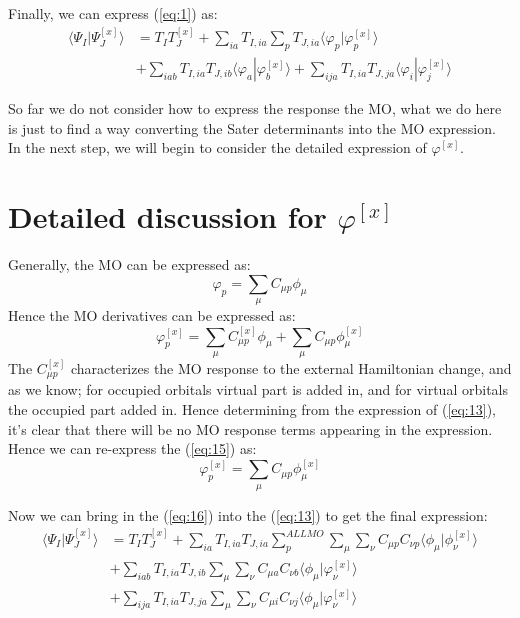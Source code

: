 \documentclass[a4paper,12pt]{article}
\theoremstyle{definition}\newtheorem{law}{Law}
\theoremstyle{plain}\newtheorem{theorem}{Theorem}
\theoremstyle{remark}\newtheorem{remark}{Remark}
\theoremstyle{axiom}\newtheorem{axiom}{Axiom}
\begin{document}
Finally, we can express (\ref{eq:1}) as:
\begin{equation}
 \label{eq:13}
\begin{split}
 \langle\Psi_{I}|\Psi_{J}^{[x]}\rangle &= T_{I}T_{J}^{[x]} +
\sum_{ia}T_{I,ia}\sum_{p}T_{J,ia}\langle\varphi_{p}|\varphi^{[x]}_{p}\rangle
\nonumber \\
&+\sum_{iab}T_{I,ia}T_{J,ib}\langle\varphi_{a}|\varphi_{b}^{[x]}\rangle
+\sum_{ija}T_{I,ia}T_{J,ja}\langle\varphi_{i}|\varphi_{j}^{[x]}\rangle 
\end{split}
\end{equation}
 
So far we do not consider how to express the response the MO, what we do here
is just to find a way converting the Sater determinants into the MO expression.
In the next step, we will begin to consider the detailed expression of
$\varphi^{[x]}$.

\section{Detailed discussion for $\varphi^{[x]}$} 
%
%
%
Generally, the MO can be expressed as:
\begin{equation}
 \label{eq:14}
\varphi_{p} = \sum_{\mu}C_{\mu p}\phi_{\mu}
\end{equation}
Hence the MO derivatives can be expressed as:
\begin{equation}
 \label{eq:15}
\varphi_{p}^{[x]} = \sum_{\mu}C^{[x]}_{\mu p}\phi_{\mu} + \sum_{\mu}C_{\mu
p}\phi^{[x]}_{\mu}
\end{equation}
The $C^{[x]}_{\mu p}$ characterizes the MO response to the external Hamiltonian
change, and as we know; for occupied orbitals virtual part is added in, and for
virtual orbitals the occupied part added in. Hence determining from the
expression of (\ref{eq:13}), it's clear that there will be no MO response terms
appearing in the expression. Hence we can re-express the (\ref{eq:15}) as:
\begin{equation}
 \label{eq:16}
\varphi_{p}^{[x]} = \sum_{\mu}C_{\mu p}\phi^{[x]}_{\mu}
\end{equation}

Now we can bring in the (\ref{eq:16}) into the (\ref{eq:13}) to get the final
expression:
\begin{equation}
 \label{eq:17}
\begin{split}
 \langle\Psi_{I}|\Psi_{J}^{[x]}\rangle &= T_{I}T_{J}^{[x]} +
\sum_{ia}T_{I,ia}T_{J,ia}\sum_{p}^{ALL MO}
\sum_{\mu}\sum_{\nu}C_{\mu p}C_{\nu p}
\langle\phi_{\mu}|\phi^{[x]}_{\nu}\rangle
\nonumber \\
&+\sum_{iab}T_{I,ia}T_{J,ib}\sum_{\mu}\sum_{\nu}C_{\mu a}C_{\nu
b}\langle\phi_{\mu}|\varphi_{\nu}^{[x]}\rangle \nonumber \\
&+\sum_{ija}T_{I,ia}T_{J,ja}\sum_{\mu}\sum_{\nu}C_{\mu i}C_{\nu
j}\langle\phi_{\mu}|\varphi_{\nu}^{[x]}\rangle 
\end{split}
\end{equation}
\end{document}
